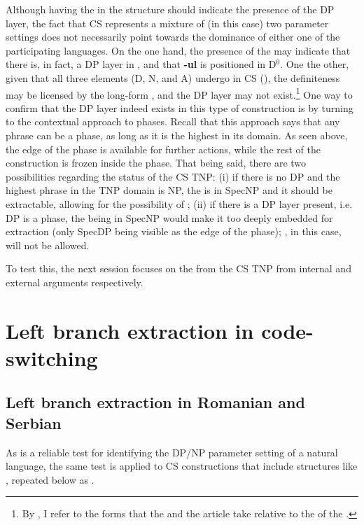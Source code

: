 \documentclass[output=paper,hidelinks,newtxmath,]{langscibook}
\begin{document}
Although having the  in the structure should indicate the presence of the DP layer, the fact that CS represents a mixture of (in this case) two parameter settings does not necessarily point towards the dominance of either one of the participating languages. On the one hand, the presence of the  may indicate that there is, in fact, a DP layer in , and that \textbf{-ul} is positioned in D$^0$. One the other, given that all three elements (D, N, and A) undergo  in CS (\citealt{Petroj}), the definiteness may be licensed by the  long-form , and the DP layer may not exist.\footnote{\label{15:fn8}By , I refer to the forms that the  and the article take relative to the  of the .} One way to confirm that the DP layer indeed exists in this type of construction is by turning to the contextual approach to phases. Recall that this approach says that any phrase can be a phase, as long as it is the highest in its domain. As seen above, the edge of the phase is available for further actions, while the rest of the construction is frozen inside the phase. That being said, there are two possibilities regarding the status of the CS TNP: (i) if there is no DP and the highest phrase in the TNP domain is NP, the  is in SpecNP and it should be extractable, allowing for the possibility of ; (ii) if there is a DP layer present, i.e. DP is a phase, the  being in SpecNP would make it too deeply embedded for extraction (only SpecDP being visible as the edge of the phase); , in this case, will not be allowed.

To test this, the next session focuses on the  from the CS TNP from internal and external arguments respectively.\largerpage

\section{Left branch extraction in code-switching}\label{15:s5}
\subsection{Left branch extraction in Romanian and Serbian}\label{15:s5.1}

As  is a reliable test for identifying the DP/NP parameter setting of a natural language, the same test is applied to CS constructions that include structures like , repeated below as .
\end{document}
